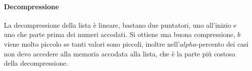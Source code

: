 \paragraph{Decompressione}
La decompressione della lista è lineare, bastano due puntatori, uno all'inizio e uno che parte 
prima dei numeri accodati.
Si ottiene una buona compressione, $b$ viene molto piccolo se tanti valori sono piccoli, inoltre nell'$alpha$-percento dei casi 
non devo accedere alla memoria accodata alla lista, che è la parte più 
costosa della decompressione.

